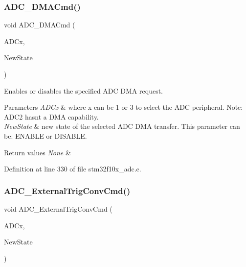 \subsubsection{\texorpdfstring{A\+D\+C\+\_\+\+D\+M\+A\+Cmd()}{ADC\_DMACmd()}}
{\footnotesize\ttfamily void A\+D\+C\+\_\+\+D\+M\+A\+Cmd (\begin{DoxyParamCaption}\item[{\hyperlink{struct_a_d_c___type_def}{A\+D\+C\+\_\+\+Type\+Def} $\ast$}]{A\+D\+Cx,  }\item[{\hyperlink{group___exported__types_gac9a7e9a35d2513ec15c3b537aaa4fba1}{Functional\+State}}]{New\+State }\end{DoxyParamCaption})}



Enables or disables the specified A\+DC D\+MA request. 


\begin{DoxyParams}{Parameters}
{\em A\+D\+Cx} & where x can be 1 or 3 to select the A\+DC peripheral. Note\+: A\+D\+C2 hasn\textquotesingle{}t a D\+MA capability. \\
\hline
{\em New\+State} & new state of the selected A\+DC D\+MA transfer. This parameter can be\+: E\+N\+A\+B\+LE or D\+I\+S\+A\+B\+LE. \\
\hline
\end{DoxyParams}

\begin{DoxyRetVals}{Return values}
{\em None} & \\
\hline
\end{DoxyRetVals}


Definition at line 330 of file stm32f10x\+\_\+adc.\+c.

\mbox{\label{group___a_d_c___private___functions_ga3ae92d7940a16c898223374a5857f509}} 
\subsubsection{\texorpdfstring{A\+D\+C\+\_\+\+External\+Trig\+Conv\+Cmd()}{ADC\_ExternalTrigConvCmd()}}
{\footnotesize\ttfamily void A\+D\+C\+\_\+\+External\+Trig\+Conv\+Cmd (\begin{DoxyParamCaption}\item[{\hyperlink{struct_a_d_c___type_def}{A\+D\+C\+\_\+\+Type\+Def} $\ast$}]{A\+D\+Cx,  }\item[{\hyperlink{group___exported__types_gac9a7e9a35d2513ec15c3b537aaa4fba1}{Functional\+State}}]{New\+State }\end{DoxyParamCaption})}



